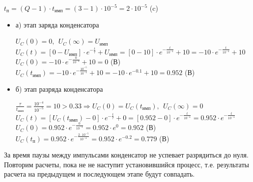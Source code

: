 		$t_\text{п} = (Q - 1) \cdot t_\text{имп} = (3 - 1) \cdot 10^{-5} = 2 \cdot 10^{-5}$ (c)
		
		
\begin{itemize}
\item[] а) этап заряда конденсатора

		$U_C(0) = 0,\ \ U_C(\infty) = U_\text{имп}$\\	
		$U_C(t) = [0 - U_\text{имп}] \cdot e^{-\frac{t}{\tau}} + U_\text{имп} = [0 - 10] \cdot e^{-\frac{t}{10^{-4}}} + 10 = -10 \cdot e^{-\frac{t}{10^{-4}}} + 10$\\
		$U_C(0) = -10 \cdot e^{-\frac{0}{10^{-4}}} + 10 = 0$ (В)\\
		$U_C(t_\text{имп}) = -10 \cdot e^{-\frac{10^{-5}}{10^{-4}}} + 10 = -10 \cdot e^{-0.1} + 10 = 0.952$ (В)\\
		
\item[] б) этап разряда конденсатора
	
		$\frac{\tau}{t_\text{имп}} = \frac{10^{-4}}{10^{-5}} = 10 > 0.33 \Rightarrow U_C(0) = U_C(t_\text{имп}),\ \ U_C(\infty) = 0$\\
		$U_C(t) = [U_C(t_\text{имп}) - 0] \cdot e^{-\frac{t}{\tau}} + 0 =  [0.952 - 0] \cdot e^{-\frac{t}{10^{-4}}} = 0.952 \cdot e^{-\frac{t}{10^{-4}}}$\\
		$U_C(0) = 0.952 \cdot e^{-\frac{0}{10^{-4}}} = 0.952 \cdot e^0 = 0.952$ (В)\\
		$U_C(t_\text{п}) = 0.952 \cdot e^{-\frac{ 2 \cdot 10^{-5}}{10^{-4}}} = 0.952 \cdot e^{-0.2} = 0.779$ (В)\\
		
\end{itemize}				
		
За время паузы между импульсами конденсатор не успевает разрядиться до нуля. Повторим расчеты, пока не не наступит установившийся процесс, т.е. результаты расчета на предыдущем и последующем этапе будут совпадать.	
	
